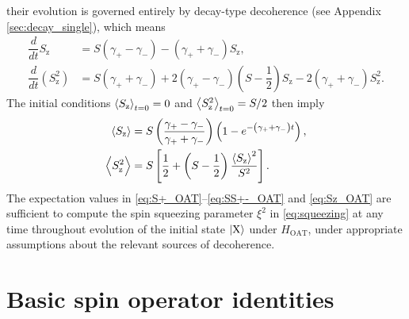 \documentclass[pra,reprint,longbibliography]{revtex4-1}
\renewcommand{\t}{\text} %
\newcommand{\f}[2]{\dfrac{#1}{#2}} %
\newcommand{\p}[1]{\left(#1\right)} %
\renewcommand{\sp}[1]{\left[#1\right]} %
\newcommand{\bk}{\Braket} %
\newcommand{\z}{\text{z}}
\newcommand{\X}{\text{X}}
\newcommand{\1}{\mathds{1}}
\begin{document}
their evolution is governed entirely by decay-type decoherence (see
Appendix \ref{sec:decay_single}), which means
\begin{align}
  \f{d}{dt} S_\z
  &= S\p{\gamma_+-\gamma_-} - \p{\gamma_++\gamma_-} S_\z,
  \\
  \f{d}{dt}\p{S_\z^2}
  &= S\p{\gamma_++\gamma_-} + 2\p{\gamma_+-\gamma_-}\p{S-\f12} S_\z
  - 2 \p{\gamma_++\gamma_-} S_\z^2.
\end{align}
The initial conditions $\bk{S_\z}_{t=0}=0$ and $\bk{S_\z^2}_{t=0}=S/2$
then imply
\begin{align}
  \bk{S_\z}
  &= S\p{\f{\gamma_+-\gamma_-}{\gamma_++\gamma_-}}
  \p{1-e^{-\p{\gamma_+ + \gamma_-} t}}, \\
  \bk{S_\z^2} &= S \sp{\f12 + \p{S-\f12} \f{\bk{S_\z}^2}{S^2}}.
  \label{eq:Sz_OAT}
\end{align}
The expectation values in \eqref{eq:S+_OAT}--\eqref{eq:SS+-_OAT} and
\eqref{eq:Sz_OAT} are sufficient to compute the spin squeezing
parameter $\xi^2$ in \eqref{eq:squeezing} at any time throughout
evolution of the initial state $\ket{\X}$ under $H_{\t{OAT}}$, under
appropriate assumptions about the relevant sources of decoherence.


\section{Basic spin operator identities}
\label{sec:identities}
\end{document}
